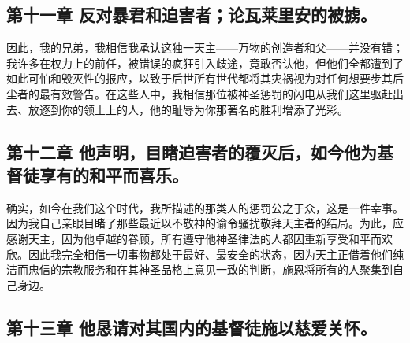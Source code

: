 
\subsection{第十一章 反对暴君和迫害者；论瓦莱里安的被掳。}

因此，我的兄弟，我相信我承认这独一天主——万物的创造者和父——并没有错；我许多在权力上的前任，被错误的疯狂引入歧途，竟敢否认他，但他们全都遭到了如此可怕和毁灭性的报应，以致于后世所有世代都将其灾祸视为对任何想要步其后尘者的最有效警告。在这些人中，我相信那位被神圣惩罚的闪电从我们这里驱赶出去、放逐到你的领土上的人，他的耻辱为你那著名的胜利增添了光彩。\par


\subsection{第十二章 他声明，目睹迫害者的覆灭后，如今他为基督徒享有的和平而喜乐。}

确实，如今在我们这个时代，我所描述的那类人的惩罚公之于众，这是一件幸事。因为我自己亲眼目睹了那些最近以不敬神的谕令骚扰敬拜天主者的结局。为此，应感谢天主，因为他卓越的眷顾，所有遵守他神圣律法的人都因重新享受和平而欢欣。因此我完全相信一切事物都处于最好、最安全的状态，因为天主正借着他们纯洁而忠信的宗教服务和在其神圣品格上意见一致的判断，施恩将所有的人聚集到自己身边。\par


\subsection{第十三章 他恳请对其国内的基督徒施以慈爱关怀。}

\par


